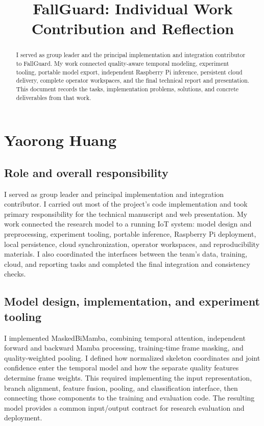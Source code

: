 \documentclass[conference,a4paper]{IEEEtran}
\begin{document}
\title{FallGuard: Individual Work Contribution and Reflection}
\author{
}
\maketitle
\begin{abstract}
I served as group leader and the principal implementation and integration contributor to FallGuard. My work connected quality-aware temporal modeling, experiment tooling, portable model export, independent Raspberry Pi inference, persistent cloud delivery, complete operator workspaces, and the final technical report and presentation. This document records the tasks, implementation problems, solutions, and concrete deliverables from that work.
\end{abstract}
\section{Yaorong Huang}
\subsection{Role and overall responsibility}

I served as group leader and principal implementation and integration contributor. I carried out most of the project's code implementation and took primary responsibility for the technical manuscript and web presentation. My work connected the research model to a running IoT system: model design and preprocessing, experiment tooling, portable inference, Raspberry Pi deployment, local persistence, cloud synchronization, operator workspaces, and reproducibility materials. I also coordinated the interfaces between the team's data, training, cloud, and reporting tasks and completed the final integration and consistency checks.

\subsection{Model design, implementation, and experiment tooling}

I implemented MaskedBiMamba, combining temporal attention, independent forward and backward Mamba processing, training-time frame masking, and quality-weighted pooling. I defined how normalized skeleton coordinates and joint confidence enter the temporal model and how the separate quality features determine frame weights. This required implementing the input representation, branch alignment, feature fusion, pooling, and classification interface, then connecting those components to the training and evaluation code. The resulting model provides a common input/output contract for research evaluation and deployment.
\end{document}
